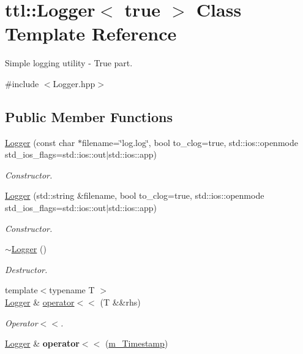 \hypertarget{classttl_1_1_logger_3_01true_01_4}{\section{ttl\-:\-:Logger$<$ true $>$ Class Template Reference}
\label{classttl_1_1_logger_3_01true_01_4}
}


Simple logging utility -\/ True part.  




{\ttfamily \#include $<$Logger.\-hpp$>$}

\subsection*{Public Member Functions}
\begin{DoxyCompactItemize}
\item 
\hyperlink{classttl_1_1_logger_3_01true_01_4_a6068268c9c9383f89c7ff3411588c04d}{Logger} (const char $\ast$filename=\char`\"{}log.\-log\char`\"{}, bool to\-\_\-clog=true, std\-::ios\-::openmode std\-\_\-ios\-\_\-flags=std\-::ios\-::out$|$std\-::ios\-::app)
\begin{DoxyCompactList}\small\item\em Constructor. \end{DoxyCompactList}\item 
\hyperlink{classttl_1_1_logger_3_01true_01_4_afa7eedcdc4d0ab642d35de8fa7038929}{Logger} (std\-::string \&filename, bool to\-\_\-clog=true, std\-::ios\-::openmode std\-\_\-ios\-\_\-flags=std\-::ios\-::out$|$std\-::ios\-::app)
\begin{DoxyCompactList}\small\item\em Constructor. \end{DoxyCompactList}\item 
\hypertarget{classttl_1_1_logger_3_01true_01_4_a353d04b6a0a678a38c3c9ff194cd8486}{\hyperlink{classttl_1_1_logger_3_01true_01_4_a353d04b6a0a678a38c3c9ff194cd8486}{$\sim$\-Logger} ()}\label{classttl_1_1_logger_3_01true_01_4_a353d04b6a0a678a38c3c9ff194cd8486}

\begin{DoxyCompactList}\small\item\em Destructor. \end{DoxyCompactList}\item 
{\footnotesize template$<$typename T $>$ }\\\hyperlink{classttl_1_1_logger}{Logger} \& \hyperlink{classttl_1_1_logger_3_01true_01_4_ab08287107b52a13d8007397d206bee9b}{operator$<$$<$} (T \&\&rhs)
\begin{DoxyCompactList}\small\item\em Operator$<$$<$. \end{DoxyCompactList}\item 
\hypertarget{classttl_1_1_logger_3_01true_01_4_a8b967c1325694484d50130f0752aac9a}{\hyperlink{classttl_1_1_logger}{Logger} \& {\bfseries operator$<$$<$} (\hyperlink{structttl_1_1m___timestamp}{m\-\_\-\-Timestamp})}\label{classttl_1_1_logger_3_01true_01_4_a8b967c1325694484d50130f0752aac9a}

\end{DoxyCompactItemize}


